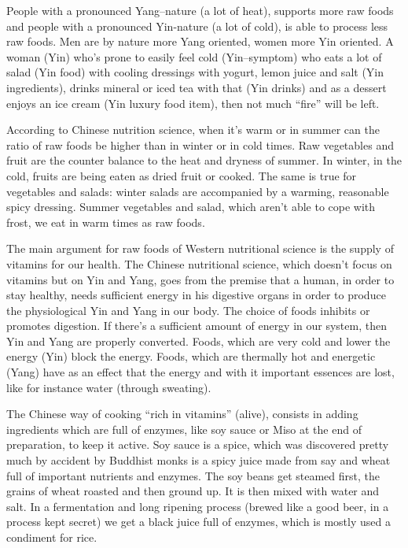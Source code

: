 \documentclass[../main.tex]{subfiles}
\begin{document}
People with a pronounced Yang--nature (a lot of heat), supports more raw foods  and people with a pronounced Yin-nature
(a lot of cold), is able to process less raw foods.
Men are by nature more Yang oriented, women more Yin oriented.
A woman (Yin) who's prone to easily feel cold (Yin--symptom) who eats a lot of salad (Yin food) with
cooling dressings with yogurt, lemon juice and salt (Yin ingredients), drinks mineral or iced tea with that (Yin drinks)
and as a dessert enjoys an ice cream (Yin luxury food item), then not much ``fire'' will be left.


According to Chinese nutrition science, when it's warm or in summer can the ratio of raw foods be higher than in winter or in cold times.
Raw vegetables and fruit are the counter balance to the heat and dryness of summer.
In winter, in the cold, fruits are being eaten as dried fruit or cooked.
The same is true for vegetables and salads: winter salads are accompanied by a warming, reasonable spicy dressing.
Summer vegetables and salad, which aren't able to cope with frost, we eat in warm times as raw foods.

The main argument for raw foods of Western nutritional science is the supply of vitamins for our health.
The Chinese nutritional science, which doesn't focus on vitamins but on Yin and Yang, goes from the premise
that a human, in order to stay healthy, needs sufficient energy in his digestive organs in order to produce
the physiological Yin and Yang in our body.
The choice of foods inhibits or promotes digestion.
If there's a sufficient amount of  energy in our system, then Yin and Yang are properly converted.
Foods, which are very cold and lower the energy (Yin) block the energy.
Foods, which are thermally hot and energetic (Yang) have as an effect that the energy and with it important
essences are lost, like for instance water (through sweating).

The Chinese way of cooking ``rich in vitamins'' (alive), consists in adding ingredients which are full of enzymes,
like soy sauce or Miso at the end of preparation, to keep it active.
Soy sauce is a spice, which was discovered pretty much by accident by Buddhist monks is a spicy juice made from say and wheat
full of important nutrients and enzymes.
The soy beans get steamed first, the grains of wheat roasted and then ground up.
It is then mixed with water and salt.
In a fermentation and long ripening process (brewed like a good beer, in a process kept secret) we get a black juice full
of enzymes, which is mostly used a condiment for rice.
\end{document}
